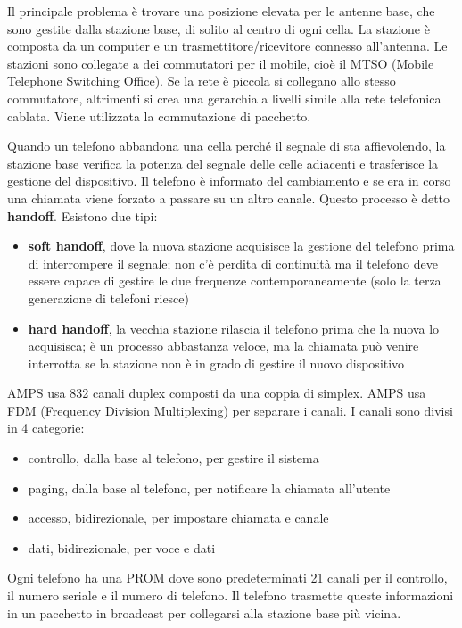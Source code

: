 Il principale problema è trovare una posizione elevata per le antenne base, che sono gestite dalla stazione base, di solito al centro di ogni cella.
La stazione è composta da un computer e un trasmettitore/ricevitore connesso all'antenna.
Le stazioni sono collegate a dei commutatori per il mobile, cioè il MTSO (Mobile Telephone Switching Office).
Se la rete è piccola si collegano allo stesso commutatore, altrimenti si crea una gerarchia a livelli simile alla rete telefonica cablata.
Viene utilizzata la commutazione di pacchetto.

Quando un telefono abbandona una cella perché il segnale di sta affievolendo, la stazione base verifica la potenza del segnale delle celle adiacenti e trasferisce la gestione del dispositivo.
Il telefono è informato del cambiamento e se era in corso una chiamata viene forzato a passare su un altro canale. 
Questo processo è detto \textbf{handoff}. Esistono due tipi:
\begin{itemize}
    \item \textbf{soft handoff}, dove la nuova stazione acquisisce la gestione del telefono prima di interrompere il segnale;
    non c'è perdita di continuità ma il telefono deve essere capace di gestire le due frequenze contemporaneamente (solo la terza generazione di telefoni riesce)
    \item \textbf{hard handoff}, la vecchia stazione rilascia il telefono prima che la nuova lo acquisisca;
    è un processo abbastanza veloce, ma la chiamata può venire interrotta se la stazione non è in grado di gestire il nuovo dispositivo
\end{itemize}
AMPS usa 832 canali duplex composti da una coppia di simplex. 
AMPS usa FDM (Frequency Division Multiplexing) per separare i canali.
I canali sono divisi in 4 categorie:
\begin{itemize}
    \item controllo, dalla base al telefono, per gestire il sistema
    \item paging, dalla base al telefono, per notificare la chiamata all'utente
    \item accesso, bidirezionale, per impostare chiamata e canale
    \item dati, bidirezionale, per voce e dati
\end{itemize}
Ogni telefono ha una PROM dove sono predeterminati 21 canali per il controllo, il numero seriale e il numero di telefono. 
Il telefono trasmette queste informazioni in un pacchetto in broadcast per collegarsi alla stazione base più vicina.

